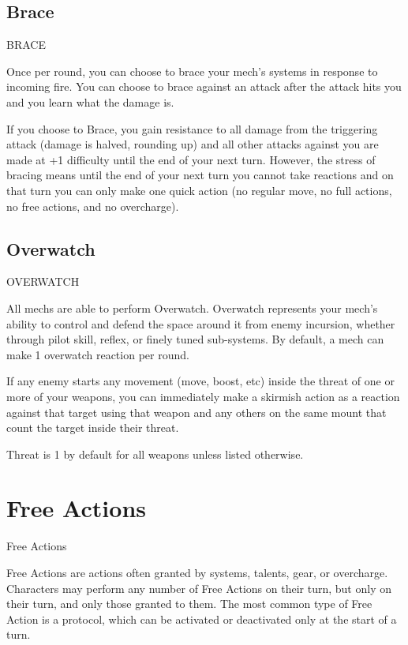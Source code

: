 \subsection{Brace}
                                                  BRACE  

Once per round, you can choose to brace your mech’s systems in response to incoming fire. You  
can choose to brace against an attack after the attack hits you and you learn what the damage  
is.
 

If you choose to Brace, you gain resistance to all damage from the triggering attack (damage is  
halved, rounding up) and all other attacks against you are made at +1 difficulty until the end of  
your next turn. However, the stress of bracing means until the end of your next turn you cannot  
take reactions and on that turn you can only make one quick action (no regular move, no full  
actions, no free actions, and no overcharge).
 \subsection{Overwatch}

                                              OVERWATCH  

All mechs are able to perform Overwatch. Overwatch represents your mech’s ability to control  
and defend the space around it from enemy incursion, whether through pilot skill, reflex, or finely  
tuned sub-systems. By default, a mech can make 1 overwatch reaction per round.
 

If any enemy starts any movement (move, boost, etc) inside the threat of one or more of your  
weapons, you can immediately make a skirmish action as a reaction against that target using  
that weapon and any others on the same mount that count the target inside their threat.
 

Threat is 1 by default for all weapons unless listed otherwise.

\section{Free Actions}
   Free Actions  

Free Actions are actions often granted by systems, talents, gear, or overcharge. Characters may  
perform any number of Free Actions on their turn, but only on their turn, and only those granted  
to them. The most common type of Free Action is a protocol, which can be activated or  
deactivated only at the start of a turn.

